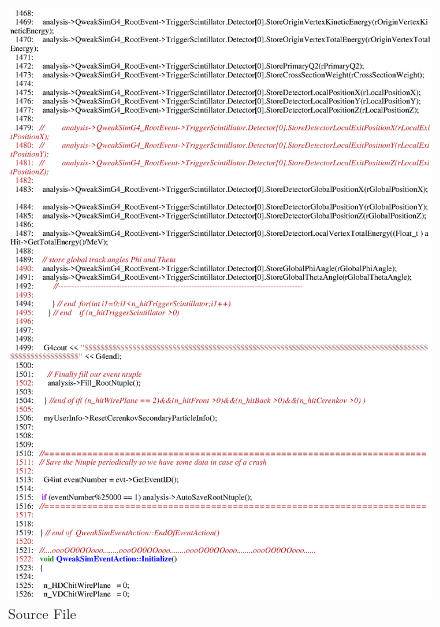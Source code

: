 \begin{figure}[h]
  \hspace{0cm}
  \includegraphics[scale=0.8]{./figures13/QweakSimEventAction.cc-p26.eps}
  \caption{\label{SourceXIII41}Source File}
           \label{fig:XIII-SC-41}
\end{figure}

\clearpage

